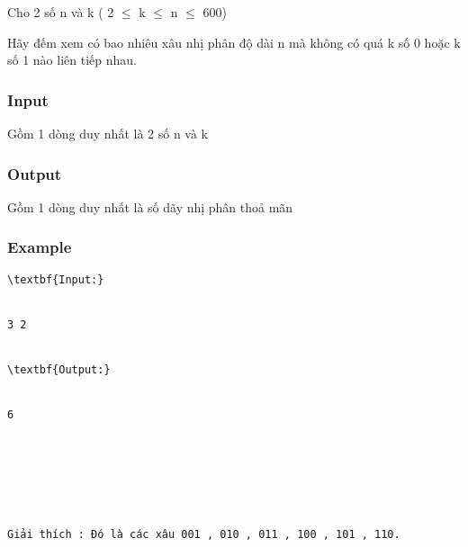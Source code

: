 



   Cho 2 số n và k ( 2 $\le$ k  $\le$  n  $\le$  600)  

   Hãy đếm xem có bao nhiêu xâu nhị phân độ dài n mà không có quá k số 0 hoặc k số 1 nào liên tiếp nhau.  

\subsubsection{   Input  }

   Gồm 1 dòng duy nhất là 2 số n và k  

\subsubsection{   Output  }

   Gồm 1 dòng duy nhất là số dãy nhị phân thoả mãn  

\subsubsection{   Example  }
\begin{verbatim}
\textbf{Input:}


3 2


\textbf{Output:}


6







Giải thích : Đó là các xâu 001 , 010 , 011 , 100 , 101 , 110.


\end{verbatim}
